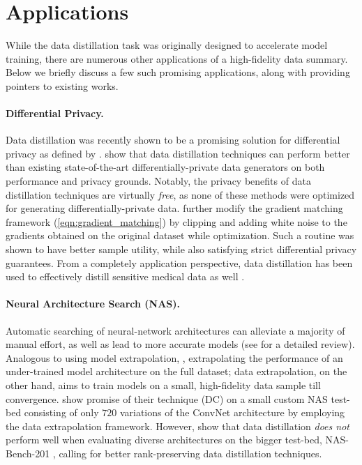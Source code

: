 \documentclass[10pt]{article} %
\begin{document}
\section{Applications} \label{sec:applications}
While the data distillation task was originally designed to accelerate model training, there are numerous other applications of a high-fidelity data summary. Below we briefly discuss a few such promising applications, along with providing pointers to existing works.

\paragraph{Differential Privacy.} Data distillation was recently shown to be a promising solution for differential privacy as defined by \citet{differential_privacy_dwork}. \citet{privacy_free} show that data distillation techniques can perform better than existing state-of-the-art differentially-private data generators \citep{dp_merf, dp_sinkhorn} on both performance and privacy grounds. Notably, the privacy benefits of data distillation techniques are virtually \emph{free}, as none of these methods were optimized for generating differentially-private data. \citet{dd_privacy_clipped} further modify the gradient matching framework (\cref{eqn:gradient_matching}) by clipping and adding white noise to the gradients obtained on the original dataset while optimization. Such a routine was shown to have better sample utility, while also satisfying strict differential privacy guarantees. From a completely application perspective, data distillation has been used to effectively distill sensitive medical data as well \citep{medical_dd_1, medical_dd_2}. 

\paragraph{Neural Architecture Search (NAS).} Automatic searching of neural-network architectures can alleviate a majority of manual effort, as well as lead to more accurate models
(see \citet{nas_survey} for a detailed review). Analogous to using model extrapolation, \ie, extrapolating the performance of an under-trained model architecture on the full dataset; data extrapolation, on the other hand, aims to train models on a small, high-fidelity data sample till convergence. 
\citet{zhao_dc} 
show promise of their technique (DC) on a small custom NAS test-bed consisting of only $720$ variations of the ConvNet architecture \citep{conv_net} by employing the data extrapolation framework. However, \citet{dc_bench} show that data distillation \emph{does not} perform well when evaluating diverse architectures on the bigger test-bed, NAS-Bench-201 \citep{nas_201}, calling for better rank-preserving data distillation techniques.
\end{document}
